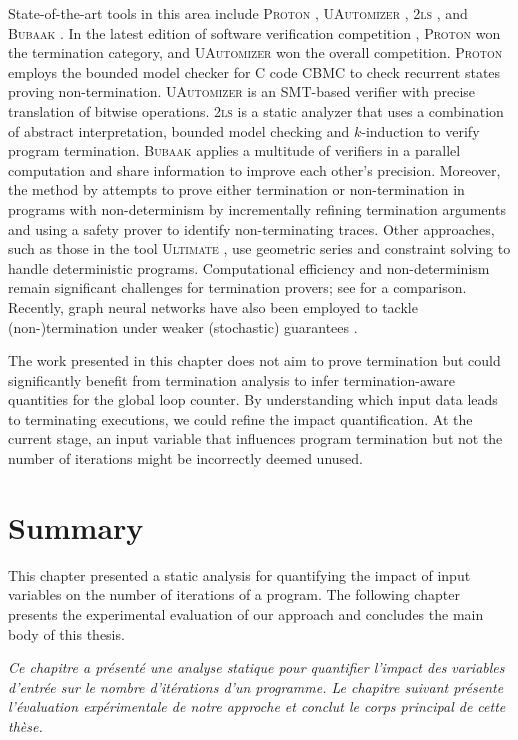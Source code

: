 State-of-the-art tools in this area include \textsc{Proton} , \textsc{UAutomizer} , \textsc{2ls} , and \textsc{Bubaak} . In the latest edition of software verification competition , \textsc{Proton} won the termination category, and \textsc{UAutomizer} won the overall competition. \textsc{Proton} employs the bounded model checker for C code CBMC to check recurrent states proving non-termination. \textsc{UAutomizer} is an SMT-based verifier with precise translation of bitwise operations. \textsc{2ls} is a static analyzer that uses a combination of abstract interpretation, bounded model checking and $k$-induction to verify program termination. \textsc{Bubaak} applies a multitude of verifiers in a parallel computation and share information to improve each other's precision.
Moreover, the method by  attempts to prove either termination or non-termination in programs with non-determinism by incrementally refining termination arguments and using a safety prover to identify non-terminating traces. Other approaches, such as those in the tool \textsc{Ultimate} \cite{Leike2018, Chen2018}, use geometric series and constraint solving to handle deterministic programs. Computational efficiency and non-determinism remain significant challenges for termination provers; see  for a comparison.
Recently, graph neural networks have also been employed to tackle (non-)termination under weaker (stochastic) guarantees .

The work presented in this chapter does not aim to prove termination but could significantly benefit from termination analysis to infer termination-aware quantities for the global loop counter. By understanding which input data leads to terminating executions, we could refine the impact quantification. At the current stage, an input variable that influences program termination but not the number of iterations might be incorrectly deemed unused.



\section{Summary}

This chapter presented a static analysis for quantifying the impact of input variables on the number of iterations of a program.
The following chapter presents the experimental evaluation of our approach and concludes the main body of this thesis.


\frenchdiv

\emph{Ce chapitre a présenté une analyse statique pour quantifier l'impact des variables d'entrée sur le nombre d'itérations d'un programme. Le chapitre suivant présente l'évaluation expérimentale de notre approche et conclut le corps principal de cette thèse.}
